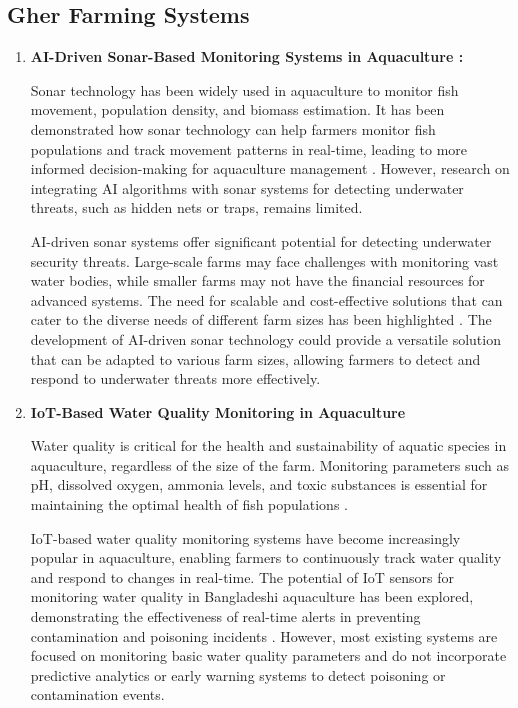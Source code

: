 \documentclass[conference]{IEEEtran}
\begin{document}
\subsection{\textbf{Gher Farming Systems}}
\begin{enumerate}
	\item \textbf{AI-Driven Sonar-Based Monitoring Systems in Aquaculture : }
	
Sonar technology has been widely used in aquaculture to monitor fish movement, population density, and biomass estimation. It has been demonstrated how sonar technology can help farmers monitor fish populations and track movement patterns in real-time, leading to more informed decision-making for aquaculture management \cite{ref13}. However, research on integrating AI algorithms with sonar systems for detecting underwater threats, such as hidden nets or traps, remains limited.

AI-driven sonar systems offer significant potential for detecting underwater security threats. Large-scale farms may face challenges with monitoring vast water bodies, while smaller farms may not have the financial resources for advanced systems. The need for scalable and cost-effective solutions that can cater to the diverse needs of different farm sizes has been highlighted \cite{ref14}. The development of AI-driven sonar technology could provide a versatile solution that can be adapted to various farm sizes, allowing farmers to detect and respond to underwater threats more effectively.


	\item \textbf{IoT-Based Water Quality Monitoring in Aquaculture}
	
	Water quality is critical for the health and sustainability of aquatic species in aquaculture, regardless of the size of the farm. Monitoring parameters such as pH, dissolved oxygen, ammonia levels, and toxic substances is essential for maintaining the optimal health of fish populations \cite{ref7}.

IoT-based water quality monitoring systems have become increasingly popular in aquaculture, enabling farmers to continuously track water quality and respond to changes in real-time. The potential of IoT sensors for monitoring water quality in Bangladeshi aquaculture has been explored, demonstrating the effectiveness of real-time alerts in preventing contamination and poisoning incidents \cite{ref16}. However, most existing systems are focused on monitoring basic water quality parameters and do not incorporate predictive analytics or early warning systems to detect poisoning or contamination events.


\end{enumerate}
\end{document}
